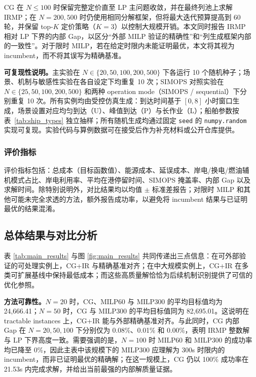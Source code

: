 \documentclass[UTF8, a4paper, 12pt]{ctexart}
\theoremstyle{plain}
\theoremstyle{definition}
\theoremstyle{remark}
\begin{document}
CG 在 $N\le 100$ 时保留完整定价直至 LP 主问题收敛，并在最终列池上求解 IRMP；在 $N=200,500$ 时仍使用相同分解框架，但将最大迭代预算提高到 60 轮，并保留 top-$K$ 定价策略（$K=3$）以控制大规模开销。本文同时报告 IRMP 相对 LP 下界的内部 Gap，以区分“外部 MILP 验证的精确性”和“列生成框架内部的一致性”。对于限时 MILP，若在给定时限内未能证明最优，本文将其视为 incumbent，而不将其误写为精确基准。

\textbf{可复现性说明。}主实验在 $N\in\{20,50,100,200,500\}$ 下各运行 10 个随机种子；场景、机制与敏感性实验在各自设定下均重复 10 次；SIMOPS 对照实验在 $N\in\{25,50,100,200,500\}$ 和两种 operation mode（SIMOPS / sequential）下分别重复 10 次。所有实例均由受控仿真生成：到达时间基于 $[0,8]$ 小时窗口生成，场景设置对应均匀到达（U）、峰值到达（P）与长作业（L）；船舶参数按表~\ref{tab:ship_types} 独立抽样；所有随机生成均通过固定 \texttt{seed} 的 \texttt{numpy.random} 实现可复现。实验代码与算例数据可在接受后作为补充材料或公开仓库提供。

\subsubsection{评价指标}
\label{sec:metrics}
评价指标包括：总成本（目标函数值）、能源成本、延误成本、岸电/换电/燃油辅机模式占比、岸电利用率、平均在港停留时间、SIMOPS 掩盖率、内部 Gap 以及求解时间。除特别说明外，对比结果均以均值 $\pm$ 标准差报告；对限时 MILP 和其他可能未完全求透的方法，额外报告成功率，以避免将 incumbent 结果与已证明最优的结果混淆。

\subsection{总体结果与对比分析}
\label{sec:overall_results}
表 \ref{tab:main_results} 与图 \ref{fig:main_results} 共同传递出三点信息：在可外部验证的可处理实例上，CG+IR 与精确基准对齐；在中大规模实例上，CG+IR 在多类可扩展基线中保持最低成本；而这些高质量解恰恰为后续机制识别提供了可信的优化参照。

\textbf{方法可靠性。}$N=20$ 时，CG、MILP60 与 MILP300 的平均目标值均为 24{,}666.41；$N=50$ 时，CG 与 MILP300 的平均目标值同为 82{,}695.01。这说明在 tractable instances 上，CG+IR 能与外部精确基准对齐。与此同时，CG 内部 Gap 在 $N=20,50,100$ 下分别仅为 0.08\%、0.01\% 和 0.00\%，表明 IRMP 整数解与 LP 下界高度一致。需要强调的是，$N=100$ 时 MILP60 和 MILP300 的成功率均已降至 0\%，因此主表中该规模下的 MILP300 应理解为 300s 时限内的 incumbent，而非已证明最优的精确解；在这一规模上，CG 仍以 100\% 成功率在 21.53s 内完成求解，并给出当前最强的内部解质量证据。
\end{document}
